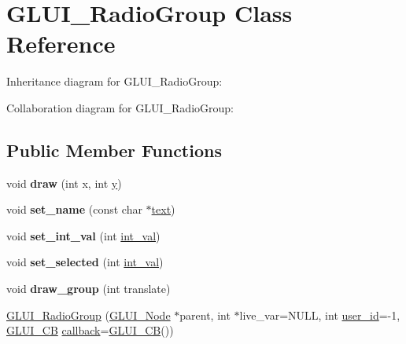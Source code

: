 \hypertarget{class_g_l_u_i___radio_group}{\section{G\+L\+U\+I\+\_\+\+Radio\+Group Class Reference}
\label{class_g_l_u_i___radio_group}
}


Inheritance diagram for G\+L\+U\+I\+\_\+\+Radio\+Group\+:


Collaboration diagram for G\+L\+U\+I\+\_\+\+Radio\+Group\+:
\subsection*{Public Member Functions}
\begin{DoxyCompactItemize}
\item 
\hypertarget{class_g_l_u_i___radio_group_ac29a2b338b80e74267efb42f94b380e0}{void {\bfseries draw} (int x, int \hyperlink{_ice_utils_8h_aa7ffaed69623192258fb8679569ff9ba}{y})}\label{class_g_l_u_i___radio_group_ac29a2b338b80e74267efb42f94b380e0}

\item 
\hypertarget{class_g_l_u_i___radio_group_a8a3caea1aa9f603fae4ceab1c4e1b83a}{void {\bfseries set\+\_\+name} (const char $\ast$\hyperlink{class_g_l_u_i___control_af0d60e9736f4dbc34e9a536e75876d72}{text})}\label{class_g_l_u_i___radio_group_a8a3caea1aa9f603fae4ceab1c4e1b83a}

\item 
\hypertarget{class_g_l_u_i___radio_group_a9dc08156997557c983d402682dd01557}{void {\bfseries set\+\_\+int\+\_\+val} (int \hyperlink{class_g_l_u_i___control_a4a890b5b5a854b34200b5e63f1069b4e}{int\+\_\+val})}\label{class_g_l_u_i___radio_group_a9dc08156997557c983d402682dd01557}

\item 
\hypertarget{class_g_l_u_i___radio_group_ade83c982cd22902440bf1b5dcb3971ef}{void {\bfseries set\+\_\+selected} (int \hyperlink{class_g_l_u_i___control_a4a890b5b5a854b34200b5e63f1069b4e}{int\+\_\+val})}\label{class_g_l_u_i___radio_group_ade83c982cd22902440bf1b5dcb3971ef}

\item 
\hypertarget{class_g_l_u_i___radio_group_a5feb3d5983d432a037e7fed7ebd7f3c0}{void {\bfseries draw\+\_\+group} (int translate)}\label{class_g_l_u_i___radio_group_a5feb3d5983d432a037e7fed7ebd7f3c0}

\item 
\hyperlink{class_g_l_u_i___radio_group_a36c19d4c90c003ca6f49de004be96a90}{G\+L\+U\+I\+\_\+\+Radio\+Group} (\hyperlink{class_g_l_u_i___node}{G\+L\+U\+I\+\_\+\+Node} $\ast$parent, int $\ast$live\+\_\+var=N\+U\+L\+L, int \hyperlink{class_g_l_u_i___control_a6c88b7c72b0800f88a5d4cda4868c8b6}{user\+\_\+id}=-\/1, \hyperlink{class_g_l_u_i___c_b}{G\+L\+U\+I\+\_\+\+C\+B} \hyperlink{class_g_l_u_i___control_a96060fe0cc6d537e736dd6eef78e24ab}{callback}=\hyperlink{class_g_l_u_i___c_b}{G\+L\+U\+I\+\_\+\+C\+B}())
\end{DoxyCompactItemize}
